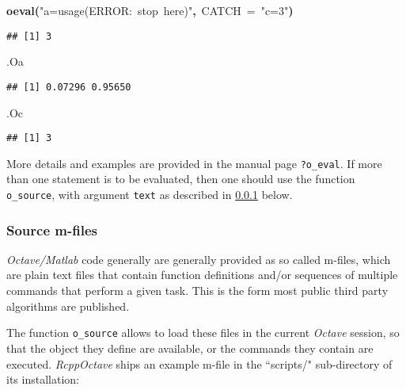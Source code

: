 \documentclass[english,10pt,a4paper]{article}\usepackage{graphicx, color}
\makeatletter
\newcommand{\hlfunctioncall}[1]{\textcolor[rgb]{0.501960784313725,0,0.329411764705882}{\textbf{#1}}}%
\newcommand{\hlstring}[1]{\textcolor[rgb]{0.6,0.6,1}{#1}}%
\newcommand{\hlkeyword}[1]{\textcolor[rgb]{0,0,0}{\textbf{#1}}}%
\newcommand{\hlargument}[1]{\textcolor[rgb]{0.690196078431373,0.250980392156863,0.0196078431372549}{#1}}%
\newcommand{\hlsymbol}[1]{\textcolor[rgb]{0,0,0}{#1}}%
\newcommand{\hlstd}[1]{\textcolor[rgb]{0,0,0}{#1}}%
\newenvironment{kframe}{%
 \def\FrameCommand##1{\hskip\@totalleftmargin \hskip-\fboxsep
 \colorbox{shadecolor}{##1}\hskip-\fboxsep
     \hskip-\linewidth \hskip-\@totalleftmargin \hskip\columnwidth}%
 \MakeFramed {\advance\hsize-\width
   \@totalleftmargin\z@ \linewidth\hsize
   \@setminipage}}%
 {\par\unskip\endMakeFramed}
\newenvironment{knitrout}{}{} %
\let\proglang=\textit
\let\code=\texttt
\newcommand{\pkgname}[1]{\textit{#1}\xspace}
\newcommand{\octave}{\proglang{Octave}\xspace}
\makeatother
\begin{document}
\begin{knitrout}
\begin{kframe}
\begin{flushleft}
\hlstd{}\hlfunctioncall{o\usebox{\hlnormalsizeboxunderscore}eval}\hlkeyword{(}\hlstring{"{}a=usage(\usebox{\hlnormalsizeboxsinglequote}ERROR:{\ }stop{\ }here\usebox{\hlnormalsizeboxsinglequote})"{}}\hlkeyword{,}{\ }\hlargument{CATCH}{\ }\hlargument{=}{\ }\hlstring{"{}c=3"{}}\hlkeyword{)}\mbox{}
\normalfont
\end{flushleft}
\begin{verbatim}
## [1] 3
\end{verbatim}
\begin{flushleft}
\ttfamily\noindent
\hlsymbol{.O}\hlkeyword{\usebox{\hlnormalsizeboxdollar}}\hlsymbol{a}\mbox{}
\normalfont
\end{flushleft}
\begin{verbatim}
## [1] 0.07296 0.95650
\end{verbatim}
\begin{flushleft}
\ttfamily\noindent
\hlsymbol{.O}\hlkeyword{\usebox{\hlnormalsizeboxdollar}}\hlsymbol{c}\mbox{}
\normalfont
\end{flushleft}
\begin{verbatim}
## [1] 3
\end{verbatim}
\end{kframe}
\end{knitrout}


More details and examples are provided in the manual page \code{?o\_eval}.
If more than one statement is to be evaluated, then one should use the function
\code{o\_source}, with argument \code{text} as described in \cref{sec:o_source} below.

\subsubsection{Source m-files}
\label{sec:o_source}

\proglang{Octave/Matlab} code generally are generally provided as so
called m-files, which are plain text files that contain function definitions
and/or sequences of multiple commands that perform a given task.
This is the form most public third party algorithms are published.

The function \code{o\_source} allows to load these files in the current
\octave session, so that the object they define are available, or the
commands they contain are executed.
\pkgname{RcppOctave} ships an example m-file in the ``scripts/" sub-directory
of its installation:
\end{document}
